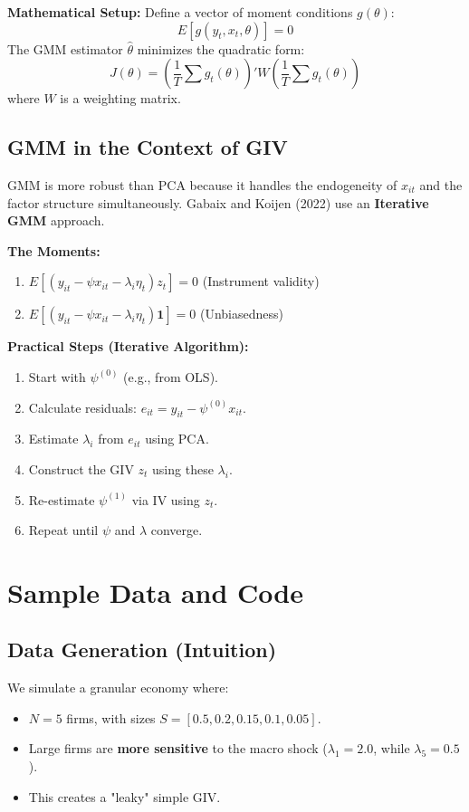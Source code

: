 \documentclass[11pt]{article}
\begin{document}
\textbf{Mathematical Setup:}
Define a vector of moment conditions $g(\theta)$:
\begin{equation}
    E[g(y_t, x_t, \theta)] = 0
\end{equation}
The GMM estimator $\hat{\theta}$ minimizes the quadratic form:
\begin{equation}
    J(\theta) = \left( \frac{1}{T} \sum g_t(\theta) \right)' W \left( \frac{1}{T} \sum g_t(\theta) \right)
\end{equation}
where $W$ is a weighting matrix.

\subsection{GMM in the Context of GIV}
GMM is more robust than PCA because it handles the endogeneity of $x_{it}$ and the factor structure simultaneously. Gabaix and Koijen (2022) use an \textbf{Iterative GMM} approach.

\textbf{The Moments:}
\begin{enumerate}
    \item $E[(y_{it} - \psi x_{it} - \lambda_i \eta_t) z_t] = 0$ (Instrument validity)
    \item $E[(y_{it} - \psi x_{it} - \lambda_i \eta_t) \mathbf{1}] = 0$ (Unbiasedness)
\end{enumerate}

\textbf{Practical Steps (Iterative Algorithm):}
\begin{enumerate}
    \item Start with $\psi^{(0)}$ (e.g., from OLS).
    \item Calculate residuals: $e_{it} = y_{it} - \psi^{(0)} x_{it}$.
    \item Estimate $\lambda_i$ from $e_{it}$ using PCA.
    \item Construct the GIV $z_t$ using these $\lambda_i$.
    \item Re-estimate $\psi^{(1)}$ via IV using $z_t$.
    \item Repeat until $\psi$ and $\lambda$ converge.
\end{enumerate}

\newpage
\section{Sample Data and Code}

\subsection{Data Generation (Intuition)}
We simulate a granular economy where:
\begin{itemize}
    \item $N=5$ firms, with sizes $S = [0.5, 0.2, 0.15, 0.1, 0.05]$.
    \item Large firms are \textbf{more sensitive} to the macro shock ($\lambda_1 = 2.0$, while $\lambda_5 = 0.5$).
    \item This creates a "leaky" simple GIV.
\end{itemize}
\end{document}
